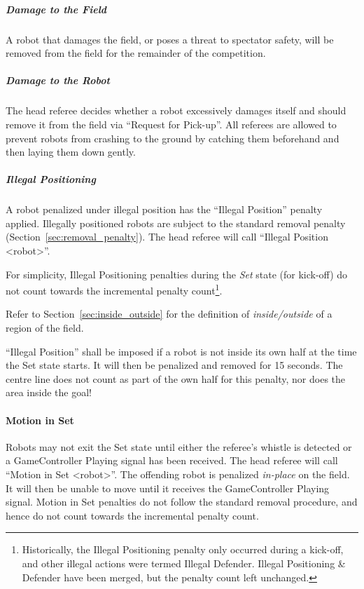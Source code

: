 \subparagraph{Damage to the Field}
\label{sec:damage}

A robot that damages the field, or poses a threat to spectator safety, will be removed from the field for the remainder of the competition.

\subparagraph{Damage to the Robot}
\label{sec:damage}

The head referee decides whether a robot excessively damages itself and should remove it from the field via ``Request for Pick-up''. 
All referees are allowed to prevent robots from crashing to the ground by catching them beforehand and then laying them down gently.

\subparagraph{Illegal Positioning}
\label{sec:illegal_positioning}

A robot penalized under illegal position has the ``Illegal Position'' penalty applied. Illegally positioned robots are subject to the standard removal penalty (\cf Section~\ref{sec:removal_penalty}).
The head referee will call ``Illegal Position  \textless robot\textgreater''.

For simplicity, Illegal Positioning penalties during the \textit{Set} state (for kick-off) do not count towards the incremental penalty count\footnote{Historically, the Illegal Positioning penalty only occurred during a kick-off, and other illegal actions were termed Illegal Defender. Illegal Positioning \& Defender have been merged, but the penalty count left unchanged.}.

Refer to Section~\ref{sec:inside_outside} for the definition of \textit{inside/outside} of a region of the field.

``Illegal Position'' shall be imposed if a robot is not inside its own half at the time the Set state starts. It will then be penalized and removed for 15 seconds. The centre line does not count as part of the own half for this penalty, nor does the area inside the goal!

\paragraph{Motion in Set}
\label{sec:motion_in_set}

Robots may not exit the Set state until either the referee's whistle is detected or a GameController Playing signal has been received.
The head referee will call ``Motion in Set \textless robot\textgreater''.
The offending robot is penalized \textit{in-place} on the field. It will then be unable to move until it receives the GameController Playing signal. Motion in Set penalties do not follow the standard removal procedure, and hence do not count towards the incremental penalty count.

